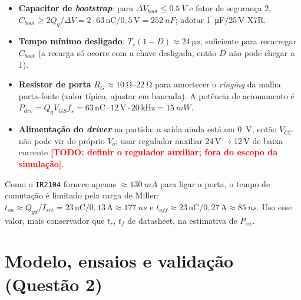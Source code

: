 \documentclass[11pt,a4paper]{article}
\newcommand{\TODO}[1]{\textcolor{red}{\textbf{[TODO: #1]}}}
\newcommand{\fs}{f_s}
\begin{document}
\begin{itemize}
 \item \textbf{Capacitor de \emph{bootstrap}}: para $\Delta V_{boot}\le\SI{0,5}{V}$ e fator de seguran\c{c}a 2, $C_{boot}\ge2Q_g/\Delta V=2\cdot63\,\text{nC}/0{,}5\,\text{V}=\SI{252}{nF}$; adotar \SI{1}{\micro F}/25\,V X7R.
 \item \textbf{Tempo m\'inimo desligado}: $T_s(1-D)\approx\SI{24}{\micro s}$, suficiente para recarregar $C_{boot}$ (a recarga s\'o ocorre com a chave desligada, ent\~ao $D$ n\~ao pode chegar a 1).
 \item \textbf{Resistor de porta} $R_G\approx\SIrange{10}{22}{\ohm}$ para amortecer o \emph{ringing} da malha porta-fonte (valor t\'ipico, ajustar em bancada). A pot\^encia de acionamento \'e $P_{drv}=Q_gV_{GS}\fs=63\,\text{nC}\cdot12\,\text{V}\cdot20\,\text{kHz}=\SI{15}{mW}$.
 \item \textbf{Alimenta\c{c}\~ao do \emph{driver}} na partida: a sa\'ida ainda est\'a em \SI{0}{V}, ent\~ao $V_{CC}$ n\~ao pode vir do pr\'oprio $V_o$; usar regulador auxiliar 24\,V$\to$12\,V de baixa corrente \TODO{definir o regulador auxiliar; fora do escopo da simula\c{c}\~ao}.
\end{itemize}
Como o \texttt{IR2104} fornece apenas $\approx\SI{130}{mA}$ para ligar a porta, o tempo de comuta\c{c}\~ao \'e limitado pela carga de Miller: $t_{on}\approx Q_{gd}/I_{src}=23\,\text{nC}/0{,}13\,\text{A}\approx\SI{177}{ns}$ e $t_{off}\approx23\,\text{nC}/0{,}27\,\text{A}\approx\SI{85}{ns}$. Uso esse valor, mais conservador que $t_r$, $t_f$ de datasheet, na estimativa de $P_{sw}$.

\section{Modelo, ensaios e valida\c{c}\~ao (Quest\~ao 2)}\label{sec:val}
\end{document}
